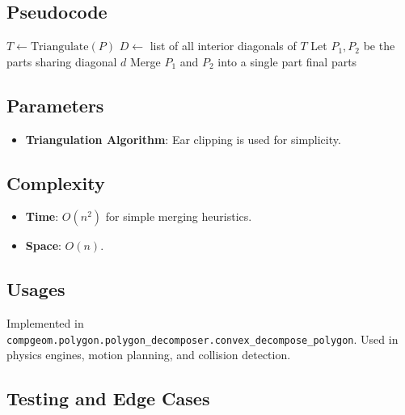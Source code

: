 \subsection{Pseudocode}

\begin{algorithm}[htbp]
\caption{Convex Decomposition via Triangle Merging}
\label{alg:convex_decomposition}
\begin{algorithmic}[1]
  \State $T \gets \text{Triangulate}(P)$
  \State $D \gets$ list of all interior diagonals of $T$
    \State Let $P_1, P_2$ be the parts sharing diagonal $d$
      \State Merge $P_1$ and $P_2$ into a single part
    \EndIf
  \EndFor
  \State \Return final parts
\EndFunction
\end{algorithmic}
\end{algorithm}

\subsection{Parameters}

\begin{itemize}
\item \textbf{Triangulation Algorithm}: Ear clipping is used for simplicity.
\end{itemize}

\subsection{Complexity}

\begin{itemize}
\item \textbf{Time}: $O(n^2)$ for simple merging heuristics.
\item \textbf{Space}: $O(n)$.
\end{itemize}

\subsection{Usages}

Implemented in \texttt{compgeom.polygon.polygon\_decomposer.convex\_decompose\_polygon}. Used in physics engines, motion planning, and collision detection.

\subsection{Testing and Edge Cases}

